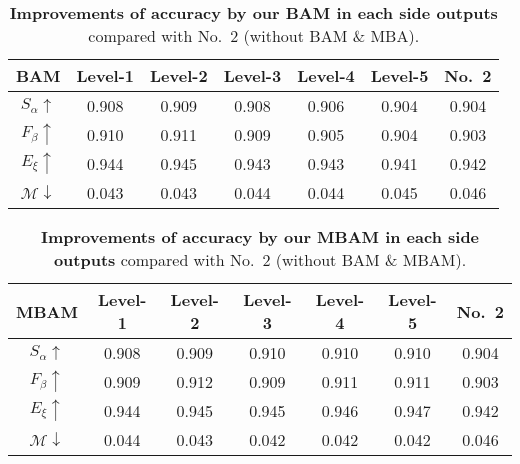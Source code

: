 \documentclass[journal]{IEEEtran}
\begin{document}
\begin{table}[t]
	\centering
	\small
	\caption{\textbf{Improvements of accuracy by our BAM in each side outputs} compared with No.\ 2 (without BAM \& MBA).  
	}
	\renewcommand{\arraystretch}{1.0}
	\renewcommand{\tabcolsep}{1.65mm}
	\begin{tabular}{c|ccccc|c}
		\hline\toprule
		BAM & Level-1   & Level-2    & Level-3  & Level-4   &  Level-5 & No.\ 2     \\
		\hline
		$S_{\alpha}\uparrow$      & 0.908 & 0.909 &  0.908 & 0.906  & 0.904 & 0.904 \\
		$F_{\beta}\uparrow$       & 0.910 & 0.911 &  0.909 & 0.905  & 0.904 & 0.903 \\
		$E_{\xi}\uparrow$         & 0.944 & 0.945 &  0.943 & 0.943  & 0.941 & 0.942 \\
		$\mathcal{M}\downarrow$   & 0.043 & 0.043 &  0.044 & 0.044  & 0.045 & 0.046 \\
		\bottomrule 
		\hline
	\end{tabular}
	\label{tab:BAM_level}
\end{table}

\begin{table}[t!]
	\centering
	\small
	\caption{\textbf{Improvements of accuracy by our MBAM in each side outputs} compared with No.\ 2 (without BAM \& MBAM).  
	}
	\renewcommand{\arraystretch}{1.0}
	\renewcommand{\tabcolsep}{1.5mm}
	\begin{tabular}{c|ccccc|c}
		\hline\toprule
		MBAM    & Level-1   & Level-2    & Level-3  & Level-4   &  Level-5 & No.\ 2     \\
		\hline
		$S_{\alpha}\uparrow$      & 0.908 & 0.909 & 0.910  & 0.910 & 0.910 & 0.904 \\
		$F_{\beta}\uparrow$       & 0.909 & 0.912 & 0.909  & 0.911 & 0.911 & 0.903 \\
		$E_{\xi}\uparrow$         & 0.944 & 0.945 & 0.945  & 0.946 & 0.947 & 0.942 \\
		$\mathcal{M}\downarrow$   & 0.044 & 0.043 & 0.042  & 0.042 & 0.042 & 0.046 \\
		\bottomrule 
		\hline
	\end{tabular}
	\label{tab:MBAM_level}
\end{table}
\end{document}
